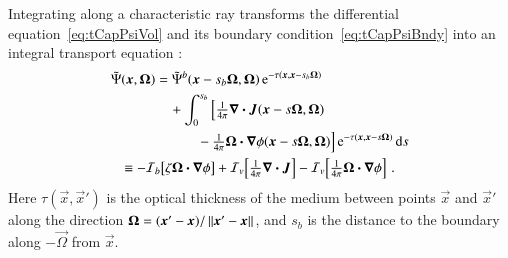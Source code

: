 \documentclass{anstrans}
\begin{document}
Integrating along a characteristic ray transforms the differential
equation~\eqref{eq:tCapPsiVol} and its boundary condition~\eqref{eq:tCapPsiBndy}
into an integral transport equation
\cite{Pri2010}:
\begin{subequations} \label{eqs:inverseTransport}
\begin{align} \label{eq:inverseTransportFull}
\begin{split}
  \tilde\Psi(\bm{x}, \bm{\Omega})
  &=
  \tilde\Psi^b(\bm{x} - s_b\bm{\Omega}, \bm{\Omega})
  \mathop{}\!\mathrm{e}^{ -\tau(\bm{x}, \bm{x} - s_b \bm{\Omega})}
  \\
  &\quad +  \int_{0}^{s_b}
  \Big[\tfrac{1}{4\pi} \bm{\nabla} \bm{\cdot}\bm{J}(\bm{x} - s \bm{\Omega}, \bm{\Omega})
  \\
  &\quad\qquad - \tfrac{1}{4\pi} \bm{\Omega}\bm{\cdot} \bm{\nabla} \phi(\bm{x} - s
  \bm{\Omega}, \bm{\Omega}) \Big]
  \mathop{}\!\mathrm{e}^{ -\tau(\bm{x}, \bm{x} - s \bm{\Omega})} \mathop{}\!\mathrm{d} s
\end{split}
\\ \label{eq:inverseTransportBrief}
\begin{split}
    &\equiv
    -\mathcal{I}_{b}\!\left[\zeta \bm{\Omega}\bm{\cdot} \bm{\nabla} \phi\right]
    + \mathcal{I}_{v}\!\left[\tfrac{1}{4\pi} \bm{\nabla} \bm{\cdot}\bm{J} \right]
    - \mathcal{I}_{v}\!\left[\tfrac{1}{4\pi} \bm{\Omega}\bm{\cdot} \bm{\nabla} \phi\right]\,.
\end{split}
\end{align}
\end{subequations}
Here $\tau(\vec{x}, \vec{x}')$ is the optical thickness of the medium between
points
$\vec{x}$ and $\vec{x}'$
along the direction $\bm{\Omega} = (\bm{x}'-
\bm{x})/\left\| \bm{x}'-\bm{x} \right\|$,
and $s_b$ is the distance to the boundary along $-\vec{\Omega}$ from
$\vec{x}$.
\end{document}
